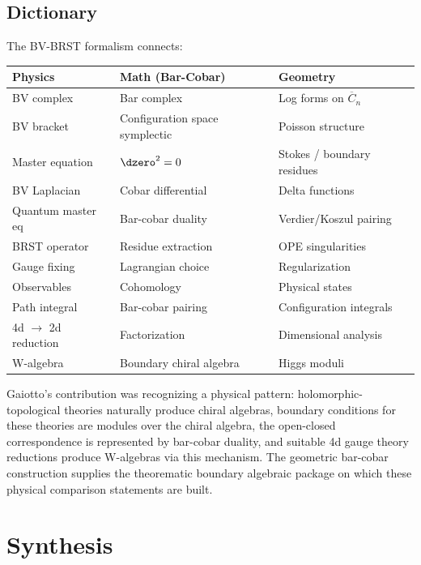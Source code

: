 \subsection{Dictionary}

\begin{remark}[Dictionary]
The BV-BRST formalism connects:

\begin{center}
\begin{tabular}{|l|l|l|}
\hline
\textbf{Physics} & \textbf{Math (Bar-Cobar)} & \textbf{Geometry} \\
\hline
BV complex & Bar complex & Log forms on $\overline{C}_n$ \\
BV bracket & Configuration space symplectic & Poisson structure \\
Master equation & $\dzero^2 = 0$ & Stokes / boundary residues \\
BV Laplacian & Cobar differential & Delta functions \\
Quantum master eq & Bar-cobar duality & Verdier/Koszul pairing \\
BRST operator & Residue extraction & OPE singularities \\
Gauge fixing & Lagrangian choice & Regularization \\
Observables & Cohomology & Physical states \\
Path integral & Bar-cobar pairing & Configuration integrals \\
4d $\to$ 2d reduction & Factorization & Dimensional analysis \\
W-algebra & Boundary chiral algebra & Higgs moduli \\
\hline
\end{tabular}
\end{center}
\end{remark}

\begin{remark}
Gaiotto's contribution was recognizing a physical pattern: holomorphic-topological theories naturally produce chiral algebras, boundary conditions for these theories are modules over the chiral algebra, the open-closed correspondence is represented by bar-cobar duality, and suitable 4d gauge theory reductions produce W-algebras via this mechanism. The geometric bar-cobar construction supplies the theorematic boundary algebraic package on which these physical comparison statements are built.
\end{remark}

\section{Synthesis}
\label{sec:htpo-supplement}

